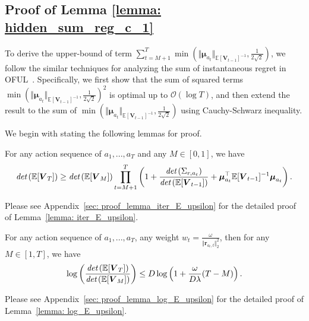 \subsection{Proof of Lemma \ref{lemma: hidden_sum_reg_c_1}}
\label{sec: proof_lemma_upbd_term1_hidden}

To derive the upper-bound of term 
$\sum_{t=M+1}^{T}
\min \left(
\Vert \boldsymbol{\mu}_{a_t} \Vert_{\mathbb{E}\left[\boldsymbol{V}_{t-1}\right]^{-1}}, 
\frac{1}{2\sqrt{2}}
\right)$, 
we follow the similar techniques for analyzing the sum of instantaneous regret in OFUL~\cite{abbasi2011improved}. Specifically, we first show that the sum of squared terms $\min \left(
\Vert \boldsymbol{\mu}_{a_t} \Vert_{\mathbb{E}\left[\boldsymbol{V}_{t-1}\right]^{-1}}, 
\frac{1}{2\sqrt{2}}
\right)^2$ is optimal up to $\mathcal{O}(\log T)$, and then extend the result to the sum of $\min \left(
\Vert \boldsymbol{\mu}_{a_t} \Vert_{\mathbb{E}\left[\boldsymbol{V}_{t-1}\right]^{-1}}, 
\frac{1}{2\sqrt{2}}
\right)$ using Cauchy-Schwarz inequality. 


We begin with stating the following lemmas for proof. 
\begin{lemma}
\label{lemma: iter_E_upsilon}
For any action sequence of ${a_1},...,{a_T}$ and any $M \in [0,1]$, we have
\[
\emph{det} \left( \mathbb{E}[\boldsymbol{V}_{T}] \right) 
\geq
\emph{det} \left( \mathbb{E}[\boldsymbol{V}_{M}] \right) 
\prod_{t=M+1}^{T} 
\left(
1 + \frac{\emph{det} \left( \Sigma_{r,a_t} \right)}{\emph{det} \left( \mathbb{E}[\boldsymbol{V}_{t-1}] \right) }
+ 
\boldsymbol{\mu}_{a_t}^{\top} \mathbb{E}[\boldsymbol{V}_{t-1}]^{-1} \boldsymbol{\mu}_{a_t}
\right).
\]
\end{lemma}
Please see Appendix~\ref{sec: proof_lemma_iter_E_upsilon} for the detailed proof of Lemma~\ref{lemma: iter_E_upsilon}.


\begin{lemma}
\label{lemma: log_E_upsilon}
For any action sequence of ${a_1},...,{a_T}$, any weight $w_t = \frac{\omega}{\Vert \boldsymbol{r}_{a_t,t} \Vert_2^2}$, then for any $M \in [1,T]$, we have
\[
\log \left( \frac{ \emph{det} \left(\mathbb{E}[\boldsymbol{V}_{T}] \right) }{ \emph{det} \left(\mathbb{E}[\boldsymbol{V}_{M}] \right)} \right)
\leq 
D \log \left( 1 + \frac{\omega}{D \lambda}(T-M) \right).
\]
\end{lemma}

Please see Appendix~\ref{sec: proof_lemma_log_E_upsilon} for the detailed proof of Lemma~\ref{lemma: log_E_upsilon}.

